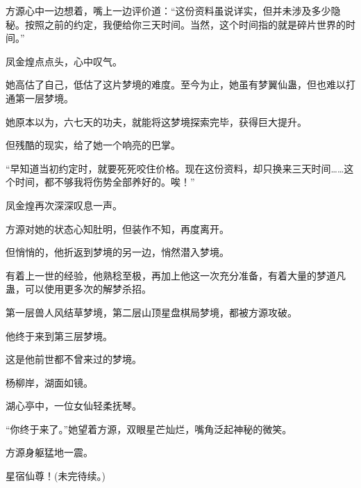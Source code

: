 \begin{this_body}
方源心中一边想着，嘴上一边评价道：“这份资料虽说详实，但并未涉及多少隐秘。按照之前的约定，我便给你三天时间。当然，这个时间指的就是碎片世界的时间。”

凤金煌点点头，心中叹气。

她高估了自己，低估了这片梦境的难度。至今为止，她虽有梦翼仙蛊，但也难以打通第一层梦境。

她原本以为，六七天的功夫，就能将这梦境探索完毕，获得巨大提升。

但残酷的现实，给了她一个响亮的巴掌。

“早知道当初约定时，就要死死咬住价格。现在这份资料，却只换来三天时间……这个时间，都不够我将伤势全部养好的。唉！”

凤金煌再次深深叹息一声。

方源对她的状态心知肚明，但装作不知，再度离开。

但悄悄的，他折返到梦境的另一边，悄然潜入梦境。

有着上一世的经验，他熟稔至极，再加上他这一次充分准备，有着大量的梦道凡蛊，可以使用更多次的解梦杀招。

第一层兽人风结草梦境，第二层山顶星盘棋局梦境，都被方源攻破。

他终于来到第三层梦境。

这是他前世都不曾来过的梦境。

杨柳岸，湖面如镜。

湖心亭中，一位女仙轻柔抚琴。

“你终于来了。”她望着方源，双眼星芒灿烂，嘴角泛起神秘的微笑。

方源身躯猛地一震。

星宿仙尊！(未完待续。)

\end{this_body}

